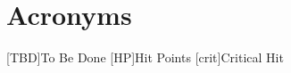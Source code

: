 
\chapter*{Acronyms}

\begin{acronym}
	[TBD]{To Be Done}
	[HP]{Hit Points}
	[crit]{Critical Hit}
\end{acronym}